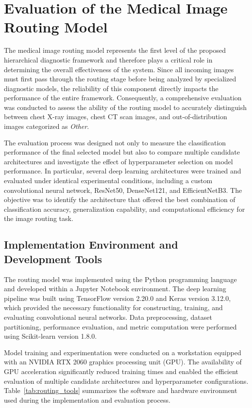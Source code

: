 \section[Routing Model Results]{Evaluation of the Medical Image Routing Model}

The medical image routing model represents the first level of the proposed hierarchical diagnostic framework and therefore plays a critical role in determining the overall effectiveness of the system. Since all incoming images must first pass through the routing stage before being analyzed by specialized diagnostic models, the reliability of this component directly impacts the performance of the entire framework. Consequently, a comprehensive evaluation was conducted to assess the ability of the routing model to accurately distinguish between chest X-ray images, chest CT scan images, and out-of-distribution images categorized as \emph{Other}.

The evaluation process was designed not only to measure the classification performance of the final selected model but also to compare multiple candidate architectures and investigate the effect of hyperparameter selection on model performance. In particular, several deep learning architectures were trained and evaluated under identical experimental conditions, including a custom convolutional neural network, ResNet50, DenseNet121, and EfficientNetB3. The objective was to identify the architecture that offered the best combination of classification accuracy, generalization capability, and computational efficiency for the image routing task.

\subsection{Implementation Environment and Development Tools}

The routing model was implemented using the Python programming language and developed within a Jupyter Notebook environment. The deep learning pipeline was built using TensorFlow version 2.20.0 and Keras version 3.12.0, which provided the necessary functionality for constructing, training, and evaluating convolutional neural networks. Data preprocessing, dataset partitioning, performance evaluation, and metric computation were performed using Scikit-learn version 1.8.0.

Model training and experimentation were conducted on a workstation equipped with an NVIDIA RTX 2060 graphics processing unit (GPU). The availability of GPU acceleration significantly reduced training times and enabled the efficient evaluation of multiple candidate architectures and hyperparameter configurations. Table~\ref{tab:routing_tools} summarizes the software and hardware environment used during the implementation and evaluation process.

